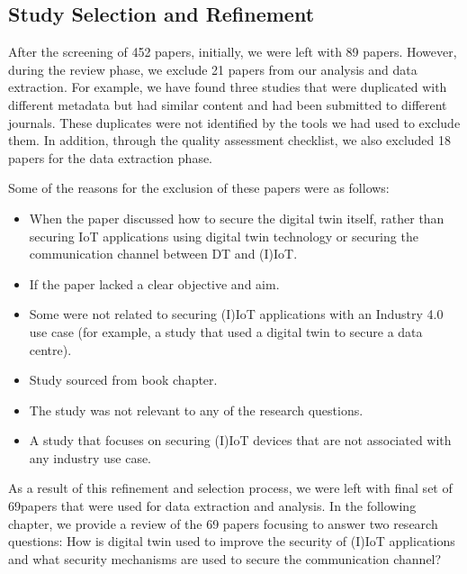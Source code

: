 \subsection{Study Selection and Refinement}

After the screening of 452 papers, initially, we were left with 89 papers. However, during the review phase, we exclude 21 papers from our analysis and data extraction. For example, we have found three studies that were duplicated with different metadata but had similar content and had been submitted to different journals. These duplicates were not identified by the tools we had used to exclude them. In addition, through the quality assessment checklist, we also excluded 18 papers for the data extraction phase.

Some of the reasons for the exclusion of these papers were as follows:

\begin{itemize}
    \item When the paper discussed how to secure the digital twin itself, rather than securing IoT applications using digital twin technology or securing the communication channel between DT and (I)IoT. 
    \item If the paper lacked a clear objective and aim.
    \item Some were not related to securing (I)IoT applications with an Industry 4.0 use case (for example, a study that used a digital twin to secure a data centre).
    \item Study sourced from book chapter. 
    \item The study was not relevant to any of the research questions.
    \item A study that focuses on securing (I)IoT devices that are not associated with any industry use case. 
\end{itemize}

As a result of this refinement and selection process, we were left with final set of 69papers that were used for data extraction and analysis. In the following chapter, we provide a review of the 69 papers focusing to answer two research questions: How is digital twin used to improve the security of (I)IoT applications and what security mechanisms are used to secure the communication channel?    



